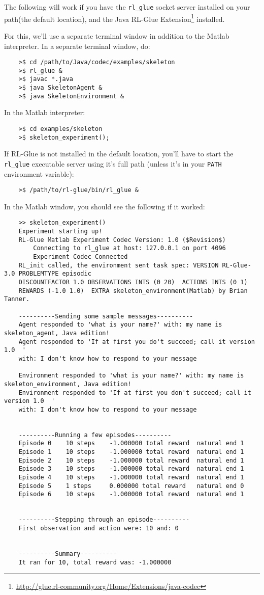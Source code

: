 \documentclass[11pt]{article}
\begin{document}
The following will work if you have the \texttt{rl\_glue} socket server installed on your path(the default location), and the Java RL-Glue Extension\footnote{\url{http://glue.rl-community.org/Home/Extensions/java-codec}} installed.

For this, we'll use a separate terminal window in addition to the Matlab interpreter.  In a separate terminal window, do:
\begin{verbatim}
	>$ cd /path/to/Java/codec/examples/skeleton
	>$ rl_glue &
	>$ javac *.java
	>$ java SkeletonAgent &
	>$ java SkeletonEnvironment &
\end{verbatim}

In the Matlab interpreter:
\begin{verbatim}
	>$ cd examples/skeleton
	>$ skeleton_experiment();
\end{verbatim}

If RL-Glue is not installed in the default location, you'll have to start the \texttt{rl\_glue} executable server using it's full path (unless it's in your \texttt{PATH} environment variable):
\begin{verbatim}
	>$ /path/to/rl-glue/bin/rl_glue &
\end{verbatim}

In the Matlab window, you should see the following if it worked:
\begin{verbatim}
	>> skeleton_experiment()
	Experiment starting up!
	RL-Glue Matlab Experiment Codec Version: 1.0 ($Revision$)
	    Connecting to rl_glue at host: 127.0.0.1 on port 4096
	    Experiment Codec Connected
	RL_init called, the environment sent task spec: VERSION RL-Glue-3.0 PROBLEMTYPE episodic 
	DISCOUNTFACTOR 1.0 OBSERVATIONS INTS (0 20)  ACTIONS INTS (0 1) 
	REWARDS (-1.0 1.0)  EXTRA skeleton_environment(Matlab) by Brian Tanner.

	----------Sending some sample messages----------
	Agent responded to 'what is your name?' with: my name is skeleton_agent, Java edition!
	Agent responded to 'If at first you do't succeed; call it version 1.0  ' 
	with: I don't know how to respond to your message

	Environment responded to 'what is your name?' with: my name is skeleton_environment, Java edition!
	Environment responded to 'If at first you don't succeed; call it version 1.0  ' 
	with: I don't know how to respond to your message


	----------Running a few episodes----------
	Episode 0	 10 steps 	 -1.000000 total reward	 natural end 1
	Episode 1	 10 steps 	 -1.000000 total reward	 natural end 1
	Episode 2	 10 steps 	 -1.000000 total reward	 natural end 1
	Episode 3	 10 steps 	 -1.000000 total reward	 natural end 1
	Episode 4	 10 steps 	 -1.000000 total reward	 natural end 1
	Episode 5	 1 steps 	 0.000000 total reward	 natural end 0
	Episode 6	 10 steps 	 -1.000000 total reward	 natural end 1


	----------Stepping through an episode----------
	First observation and action were: 10 and: 0


	----------Summary----------
	It ran for 10, total reward was: -1.000000
\end{verbatim}
\end{document}
